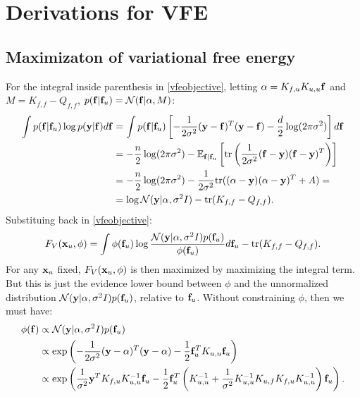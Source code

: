 \chapter{Derivations for VFE}

\section{Maximizaton of variational free energy}\label{vfemaxsection}
For the integral inside parenthesis in \eqref{vfeobjective}, letting $\alpha = K_{f,u} K_{u,u} {\mathbf f}$ and $M = K_{f,f} - Q_{f,f}$, $p({\mathbf f}|{\mathbf f}_u) = \mathcal{N}({\mathbf f}|\alpha,M)$:
\begin{equation*}
\begin{split}
\int p({\mathbf f}|{\mathbf f}_u) \log p({\mathbf y}|{\mathbf f}) d{\mathbf f} & = 
\int p({\mathbf f}|{\mathbf f}_u) \left[ -\frac{1}{2 \sigma^2} ({\mathbf y} - {\mathbf f})^T ({\mathbf y} - {\mathbf f}) -\frac{d}{2} \log(2 \pi \sigma^2) \right] d {\mathbf f} \\
 & = -\frac{n}{2}  \log(2 \pi \sigma^2) - {\mathbb E}_{{\mathbf f}|{\mathbf f}_u}\left[\text{tr}\left(\frac{1}{2\sigma^2}({\mathbf f} - {\mathbf y})({\mathbf f} - {\mathbf y})^T\right)\right] \\
 & = -\frac{n}{2} \log(2 \pi \sigma^2) - \frac{1}{2\sigma^2} \text{tr}((\alpha-{\mathbf y})(\alpha-{\mathbf y})^T + A) = \\
 & = \log \mathcal{N}({\mathbf y}|\alpha,\sigma^2 I) - \text{tr}(K_{f,f} - Q_{f,f}).
\end{split}
\end{equation*}
Substituing back in \eqref{vfeobjective}:
\begin{equation}\label{vfeobjectivepartial}
 F_V({\mathbf x}_u,\phi) = \int \phi({\mathbf f}_u) \log \frac{\mathcal{N}({\mathbf y}|\alpha,\sigma^2 I) p({\mathbf f}_u)}{\phi({\mathbf f}_u)}d{\mathbf f}_u - \text{tr}(K_{f,f} - Q_{f,f}).
\end{equation}
For any ${\mathbf x}_u$ fixed, $F_V({\mathbf x}_u,\phi)$ is then maximized by maximizing the integral term. But this is just the evidence lower bound between $\phi$ and the unnormalized distribution $\mathcal{N}({\mathbf y}|\alpha,\sigma^2 I) p({\mathbf f}_u)$, relative to ${\mathbf f}_u$. Without constraining $\phi$, then we must have:
\begin{equation}
\begin{split}
 \phi({\mathbf f}) & \propto \mathcal{N}({\mathbf y}|\alpha,\sigma^2 I) p({\mathbf f}_u) \\
		  & \propto \exp \left( -\frac{1}{2 \sigma^2}({\mathbf y} - \alpha)^T({\mathbf y} - \alpha) -\frac{1}{2} {\mathbf f}_u^T K_{u,u} {\mathbf f}_u \right) \\
		  & \propto \exp\left(\frac{1}{\sigma^2}{\mathbf y}^T K_{f,u} K_{u,u}^{-1} {\mathbf f}_u - 
			  \frac{1}{2} {\mathbf f}_u^T \left(K_{u,u}^{-1} + 
			  \frac{1}{\sigma^2} K_{u,u}^{-1} K_{u,f} K_{f,u} K_{u,u}^{-1} \right) {\mathbf f}_u \right).
\end{split}
\end{equation}
